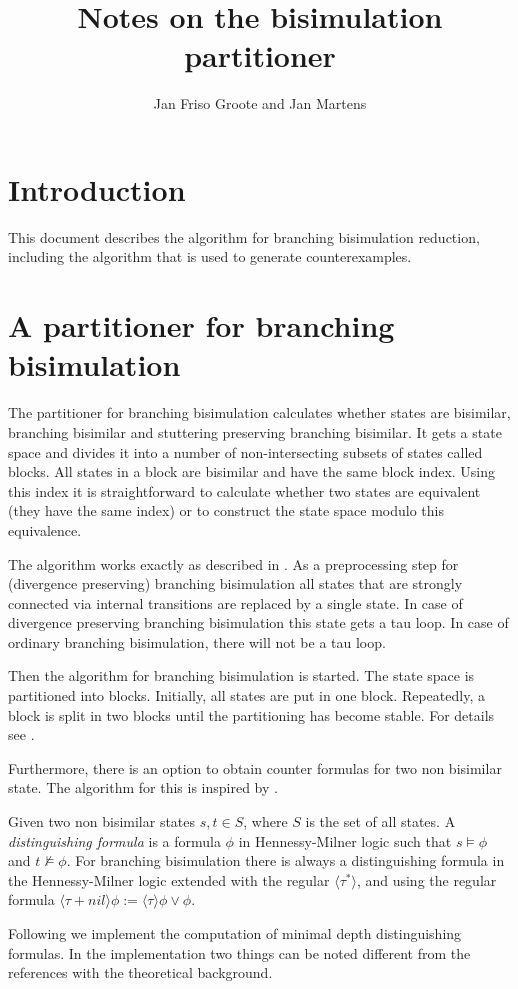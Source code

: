 \documentclass{article}
\title{Notes on the bisimulation partitioner}
\author{Jan Friso Groote and Jan Martens}
\begin{document}
\section{Introduction}
This document describes the algorithm for branching bisimulation reduction,
including the algorithm that is used to generate counterexamples.

\section{A partitioner for branching bisimulation}
The partitioner for branching bisimulation calculates 
whether states are bisimilar, branching bisimilar and stuttering
preserving branching bisimilar. It gets a state space and divides it into
a number of non-intersecting subsets of states called blocks. All
states in a block are bisimilar and have the same block index. 
Using this index it is straightforward to calculate whether two
states are equivalent (they have the same index) or to construct
the state space modulo this equivalence.

The algorithm works exactly as described in \cite{GV90}. As a preprocessing
step for (divergence
preserving) branching bisimulation all states that are strongly connected
via internal transitions are replaced by a single state. In case of divergence
preserving branching bisimulation this state gets a tau loop. In case of ordinary
branching bisimulation, there will not be a tau loop.

Then the algorithm for branching bisimulation is started. The state space is
partitioned into blocks. Initially, all states are put in one block. Repeatedly,
a block is split in two blocks until the partitioning has become stable. For
details see \cite{GV90}.

Furthermore, there is an option to obtain counter formulas for two non bisimilar
state. The algorithm for this is inspired by \cite{C90,K91}.

Given two non bisimilar states $s,t\in S$, where $S$ is the set of all states. A
{\it distinguishing formula} is a formula $\phi$ in Hennessy-Milner logic such
that $s\models\phi$ and $t\not\models\phi$. For branching bisimulation there is
always a distinguishing formula in the Hennessy-Milner logic extended with the
regular $\langle \tau^* \rangle$, and using the regular formula $\langle \tau +
\mathit{nil} \rangle \phi := \langle\tau\rangle \phi \vee \phi $. 

Following \cite{M23, M24} we implement the computation of minimal depth
distinguishing formulas. In the implementation two things can be noted different
from the references with the theoretical background.
\end{document}
